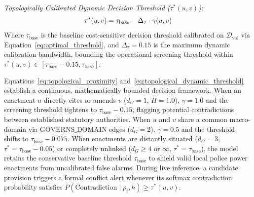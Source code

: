     \noindent\textit{Topologically Calibrated Dynamic Decision Threshold ($\tau^*(u, v)$):}
    \begin{equation}
        \tau^*(u, v) = \tau_{\text{base}} - \Delta_{\tau} \cdot \gamma(u, v)
        \label{eq:topological_dynamic_threshold}
        \eqcaption{Topologically Calibrated Dynamic Decision Threshold ($\tau^*(u, v)$)}
    \end{equation}
    \noindent Where $\tau_{\text{base}}$ is the baseline cost-sensitive decision threshold calibrated on $\mathcal{D}_{\text{val}}$ via Equation~\ref{eq:optimal_threshold}, and $\Delta_{\tau} = 0.15$ is the maximum dynamic calibration bandwidth, bounding the operational screening threshold within $\tau^*(u, v) \in [\tau_{\text{base}} - 0.15, \tau_{\text{base}}]$.

    Equations~\ref{eq:topological_proximity} and~\ref{eq:topological_dynamic_threshold} establish a continuous, mathematically bounded decision framework. When an enactment $u$ directly cites or amends $v$ ($d_G = 1$, $H = 1.0$), $\gamma = 1.0$ and the screening threshold tightens to $\tau_{\text{base}} - 0.15$, flagging potential contradictions between established statutory authorities. When $u$ and $v$ share a common macro-domain via $\text{GOVERNS\_DOMAIN}$ edges ($d_G = 2$), $\gamma = 0.5$ and the threshold shifts to $\tau_{\text{base}} - 0.075$. When enactments are distantly situated ($d_G = 3$, $\tau^* = \tau_{\text{base}} - 0.05$) or completely unlinked ($d_G \ge 4$ or $\infty$, $\tau^* = \tau_{\text{base}}$), the model retains the conservative baseline threshold $\tau_{\text{base}}$ to shield valid local police power enactments from uncalibrated false alarms. During live inference, a candidate provision triggers a formal conflict alert whenever its softmax contradiction probability satisfies $P(\text{Contradiction} \mid p_i, h) \ge \tau^*(u, v)$.


